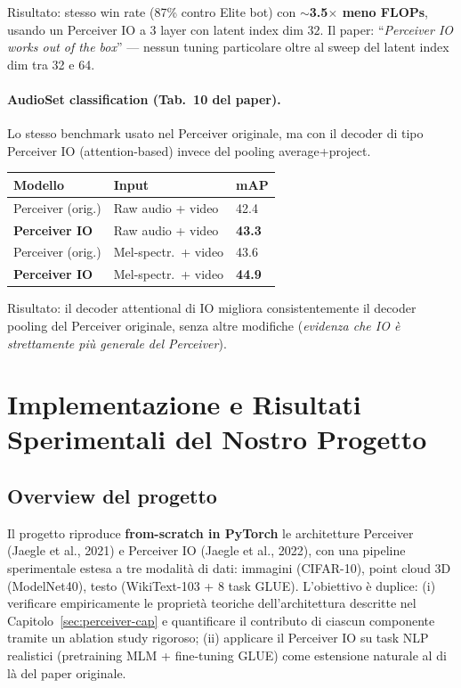 \documentclass[
  11pt,
]{article}
\begin{document}
Risultato: stesso win rate (87\% contro Elite bot) con \textbf{$\sim$3.5$\times$ meno FLOPs}, usando un Perceiver IO a 3 layer con latent index dim $32$. Il paper: ``\emph{Perceiver IO works out of the box}'' --- nessun tuning particolare oltre al sweep del latent index dim tra 32 e 64.

\paragraph{AudioSet classification (Tab.\ 10 del paper).} Lo stesso benchmark usato nel Perceiver originale, ma con il decoder di tipo Perceiver IO (attention-based) invece del pooling average+project.

{\small
\begin{longtable}{@{}p{4.5cm} p{3cm} p{2cm}@{}}
\toprule
\textbf{Modello} & \textbf{Input} & \textbf{mAP} \\
\midrule
\endhead
Perceiver (orig.) & Raw audio + video & 42.4 \\[2pt]
\textbf{Perceiver IO} & Raw audio + video & \textbf{43.3} \\[2pt]
Perceiver (orig.) & Mel-spectr.\ + video & 43.6 \\[2pt]
\textbf{Perceiver IO} & Mel-spectr.\ + video & \textbf{44.9} \\
\bottomrule
\end{longtable}
}

Risultato: il decoder attentional di IO migliora consistentemente il decoder pooling del Perceiver originale, senza altre modifiche (\emph{evidenza che IO è strettamente più generale del Perceiver}).

\section{Implementazione e Risultati Sperimentali del Nostro Progetto}
\label{sec:progetto}

\subsection{Overview del progetto}
\label{sec:progetto-overview}

Il progetto riproduce \textbf{from-scratch in PyTorch} le architetture Perceiver (Jaegle et al., 2021) e Perceiver IO (Jaegle et al., 2022), con una pipeline sperimentale estesa a tre modalità di dati: immagini (CIFAR-10), point cloud 3D (ModelNet40), testo (WikiText-103 + 8 task GLUE). L'obiettivo è duplice: (i) verificare empiricamente le proprietà teoriche dell'architettura descritte nel Capitolo~\ref{sec:perceiver-cap} e quantificare il contributo di ciascun componente tramite un ablation study rigoroso; (ii) applicare il Perceiver IO su task NLP realistici (pretraining MLM + fine-tuning GLUE) come estensione naturale al di là del paper originale.
\end{document}
